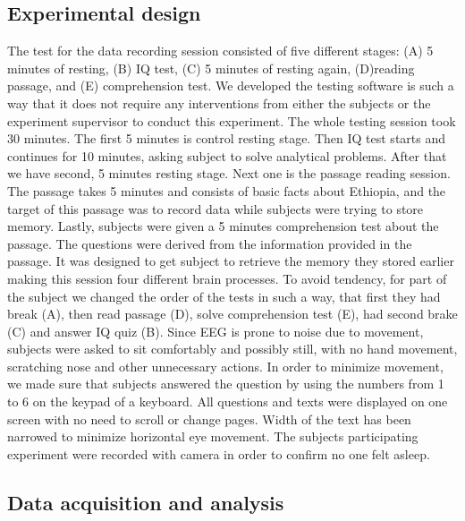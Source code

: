 \documentclass[10pt,letterpaper]{article}
\begin{document}
\subsection*{Experimental design}
The test for the data recording session consisted of five different stages: (A) 5 minutes of resting, (B) IQ test, (C) 5 minutes of resting again, (D)reading passage, and (E) comprehension test. We developed the testing software is such a way that it does not require any interventions from either the subjects or the experiment supervisor to conduct this experiment. The whole testing session took 30 minutes. The first 5 minutes is control resting stage. Then IQ test starts and continues for 10 minutes, asking subject to solve analytical problems. After that we have second, 5 minutes resting stage. Next one is the passage reading session. The passage takes 5 minutes and consists of basic facts about Ethiopia, and the target of this passage was to record data while subjects were trying to store memory. Lastly, subjects were given a 5 minutes comprehension test about the passage. The questions were derived from the information provided in the passage. It was designed to get subject to retrieve the memory they stored earlier making this session four different brain processes. To avoid tendency, for part of the subject we changed the order of the tests in such a way, that first they had break (A), then read passage (D), solve comprehension test (E), had second brake (C) and answer IQ quiz (B). Since EEG is prone to noise due to movement,  subjects were asked to sit comfortably and possibly still, with no hand movement, scratching nose and other unnecessary actions. In order to minimize movement, we made sure that subjects answered the question by using the numbers from 1 to 6 on the keypad of a keyboard. All questions and texts were displayed on one screen with no need to scroll or change pages. Width of the text has been narrowed to minimize horizontal eye movement. The subjects participating experiment were recorded with camera in order to confirm no one felt asleep.

\subsection*{Data acquisition and analysis}
\end{document}
